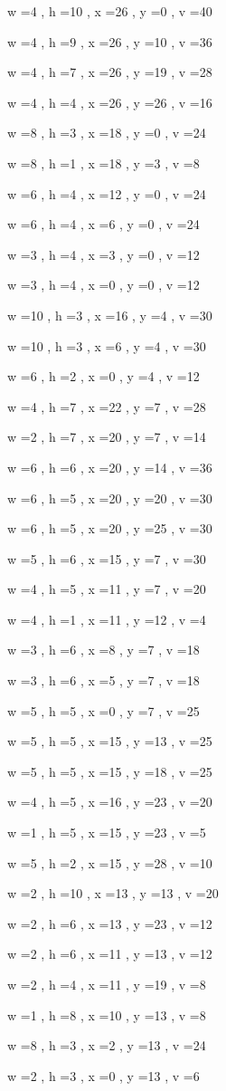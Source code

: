 \documentclass[11pt]{article}
\begin{document}
w =4 , h =10 , x =26 , y =0 , v =40
\par
w =4 , h =9 , x =26 , y =10 , v =36
\par
w =4 , h =7 , x =26 , y =19 , v =28
\par
w =4 , h =4 , x =26 , y =26 , v =16
\par
w =8 , h =3 , x =18 , y =0 , v =24
\par
w =8 , h =1 , x =18 , y =3 , v =8
\par
w =6 , h =4 , x =12 , y =0 , v =24
\par
w =6 , h =4 , x =6 , y =0 , v =24
\par
w =3 , h =4 , x =3 , y =0 , v =12
\par
w =3 , h =4 , x =0 , y =0 , v =12
\par
w =10 , h =3 , x =16 , y =4 , v =30
\par
w =10 , h =3 , x =6 , y =4 , v =30
\par
w =6 , h =2 , x =0 , y =4 , v =12
\par
w =4 , h =7 , x =22 , y =7 , v =28
\par
w =2 , h =7 , x =20 , y =7 , v =14
\par
w =6 , h =6 , x =20 , y =14 , v =36
\par
w =6 , h =5 , x =20 , y =20 , v =30
\par
w =6 , h =5 , x =20 , y =25 , v =30
\par
w =5 , h =6 , x =15 , y =7 , v =30
\par
w =4 , h =5 , x =11 , y =7 , v =20
\par
w =4 , h =1 , x =11 , y =12 , v =4
\par
w =3 , h =6 , x =8 , y =7 , v =18
\par
w =3 , h =6 , x =5 , y =7 , v =18
\par
w =5 , h =5 , x =0 , y =7 , v =25
\par
w =5 , h =5 , x =15 , y =13 , v =25
\par
w =5 , h =5 , x =15 , y =18 , v =25
\par
w =4 , h =5 , x =16 , y =23 , v =20
\par
w =1 , h =5 , x =15 , y =23 , v =5
\par
w =5 , h =2 , x =15 , y =28 , v =10
\par
w =2 , h =10 , x =13 , y =13 , v =20
\par
w =2 , h =6 , x =13 , y =23 , v =12
\par
w =2 , h =6 , x =11 , y =13 , v =12
\par
w =2 , h =4 , x =11 , y =19 , v =8
\par
w =1 , h =8 , x =10 , y =13 , v =8
\par
w =8 , h =3 , x =2 , y =13 , v =24
\par
w =2 , h =3 , x =0 , y =13 , v =6
\par
\newpage
\end{document}
